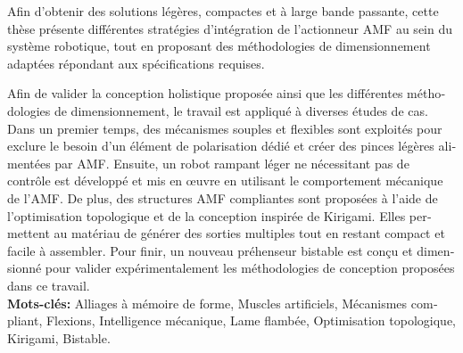 \begin{otherlanguage}{french}
Afin d’obtenir des solutions légères, compactes et à large bande passante, cette thèse présente différentes stratégies d’intégration de l’actionneur AMF au sein du système robotique, tout en proposant des méthodologies de dimensionnement adaptées répondant aux spécifications requises.

Afin de valider la conception holistique proposée ainsi que les différentes méthodologies de dimensionnement, le travail est appliqué à diverses études de cas. Dans un premier temps, des mécanismes souples et flexibles sont exploités pour exclure le besoin d’un élément de polarisation dédié et créer des pinces légères alimentées par AMF. Ensuite, un robot rampant léger ne nécessitant pas de contrôle est développé et mis en œuvre en utilisant le comportement mécanique de l’AMF. De plus, des structures AMF compliantes sont proposées à l’aide de l’optimisation topologique et de la conception inspirée de Kirigami. Elles permettent au matériau de générer des sorties multiples tout en restant compact et facile à assembler.
Pour finir, un nouveau préhenseur bistable est conçu et dimensionné pour valider expérimentalement les méthodologies de conception proposées dans ce travail.\\

\textbf{Mots-clés:} Alliages à mémoire de forme, Muscles artificiels, Mécanismes compliant, Flexions, Intelligence mécanique, Lame flambée, Optimisation topologique, Kirigami, Bistable.
\end{otherlanguage}



